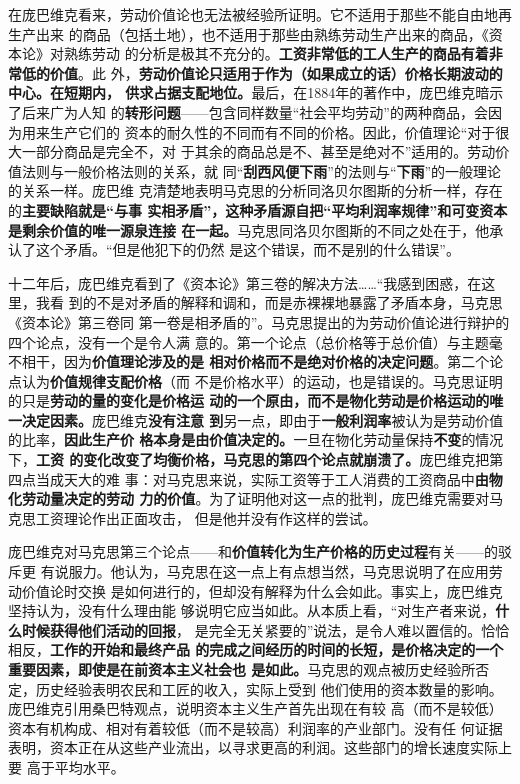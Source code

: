 在庞巴维克看来，劳动价值论也无法被经验所证明。它不适用于那些不能自由地再生产出来
的商品（包括土地），也不适用于那些由熟练劳动生产出来的商品，《资本论》对熟练劳动
的分析是极其不充分的。\textbf{工资非常低的工人生产的商品有着非常低的价值}。此
外，\textbf{劳动价值论只适用于作为（如果成立的话）价格长期波动的中心。在短期内，
  供求占据支配地位。}最后，在1884年的著作中，庞巴维克暗示了后来广为人知
的\textbf{转形问题}——包含同样数量“社会平均劳动”的两种商品，会因为用来生产它们的
资本的耐久性的不同而有不同的价格。因此，价值理论“对于很大一部分商品是完全不，对
于其余的商品总是不、甚至是绝对不”适用的。劳动价值法则与一般价格法则的关系，就
同“\textbf{刮西风便下雨}”的法则与“\textbf{下雨}”的一般理论的关系一样。庞巴维
克清楚地表明马克思的分析同洛贝尔图斯的分析一样，存在的\textbf{主要缺陷就是“与事
  实相矛盾”，这种矛盾源自把“平均利润率规律”和可变资本是剩余价值的唯一源泉连接
  在一起。}马克思同洛贝尔图斯的不同之处在于，他承认了这个矛盾。“但是他犯下的仍然
是这个错误，而不是别的什么错误”。

十二年后，庞巴维克看到了《资本论》第三卷的解决方法……“我感到困惑，在这里，我看
到的不是对矛盾的解释和调和，而是赤裸裸地暴露了矛盾本身，马克思《资本论》第三卷同
第一卷是相矛盾的”。马克思提出的为劳动价值论进行辩护的四个论点，没有一个是令人满
意的。第一个论点（总价格等于总价值）与主题毫不相干，因为\textbf{价值理论涉及的是
  相对价格而不是绝对价格的决定问题}。第二个论点认为\textbf{价值规律支配价格}（而
不是价格水平）的运动，也是错误的。马克思证明的只是\textbf{劳动的量的变化是价格运
  动的一个原由，而不是物化劳动是价格运动的唯一决定因素。}庞巴维克\textbf{没有注意
  到}另一点，即由于\textbf{一般利润率}被认为是劳动价值的比率，\textbf{因此生产价
  格本身是由价值决定的。}一旦在物化劳动量保持\textbf{不变}的情况下，\textbf{工资
  的变化改变了均衡价格，马克思的第四个论点就崩溃了。}庞巴维克把第四点当成天大的难
事：对马克思来说，实际工资等于工人消费的工资商品中\textbf{由物化劳动量决定的劳动
  力的价值}。为了证明他对这一点的批判，庞巴维克需要对马克思工资理论作出正面攻击，
但是他并没有作这样的尝试。

庞巴维克对马克思第三个论点——和\textbf{价值转化为生产价格的历史过程}有关——的驳斥更
有说服力。他认为，马克思在这一点上有点想当然，马克思说明了在应用劳动价值论时交换
是如何进行的，但却没有解释为什么会如此。事实上，庞巴维克坚持认为，没有什么理由能
够说明它应当如此。从本质上看，“对生产者来说，\textbf{什么时候获得他们活动的回报}，
是完全无关紧要的”说法，是令人难以置信的。恰恰相反，\textbf{工作的开始和最终产品
  的完成之间经历的时间的长短，是价格决定的一个重要因素，即使是在前资本主义社会也
  是如此。}马克思的观点被历史经验所否定，历史经验表明农民和工匠的收入，实际上受到
他们使用的资本数量的影响。庞巴维克引用桑巴特观点，说明资本主义生产首先出现在有较
高（而不是较低）资本有机构成、相对有着较低（而不是较高）利润率的产业部门。没有任
何证据表明，资本正在从这些产业流出，以寻求更高的利润。这些部门的增长速度实际上要
高于平均水平。

